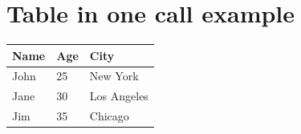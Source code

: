 \documentclass[a4paper]{report}
\begin{document}
\chapter{Table in one call example}

\noindent
\begin{tabular}{lll}
\toprule
Name & Age & City \\
\midrule
John & 25 & New York \\
Jane & 30 & Los Angeles \\
Jim & 35 & Chicago \\
\bottomrule
\end{tabular}
\par\medskip
\end{document}
